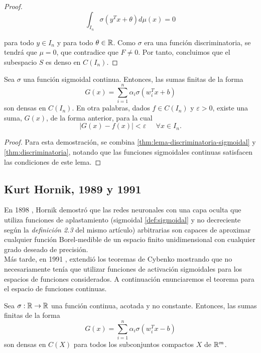 \begin{itemize}
\begin{proof}
$$\int_{I_n}\sigma(y^Tx+\theta)d\mu(x)=0$$

para todo $y\in I_n$ y para todo $\theta \in \mathbb{R}$. Como $\sigma$ era una función discriminatoria, se tendrá que $\mu=0$, que contradice que $F\ne 0$. Por tanto, concluimos que el subespacio $S$ es denso en $C(I_n)$.
\end{proof}
\begin{teorema}\label{thm:sigmoidal}
Sea $\sigma$ una función sigmoidal continua. Entonces, las sumas finitas de la forma $$G(x)=\sum_{i=1}^n \alpha_i \sigma(w_i^Tx+b)$$ son densas en $C(I_n)$. En otra palabras, dados $f\in C(I_n)$ y $\varepsilon>0$, existe una suma, $G(x)$, de la forma anterior, para la cual $$|G(x)-f(x)|<\varepsilon \;\;\;\;\; \forall x \in I_n.$$
\end{teorema}
\begin{proof}
Para esta demostración, se combina \autoref{thm:lema-discriminatoria-sigmoidal} y \autoref{thm:discriminatoria}, notando que las funciones sigmoidales continuas satisfacen las condiciones de este lema.
\end{proof}

\subsection{Kurt Hornik, 1989 y 1991}

En 1898 \cite{HornikEtAl89}, Hornik demostró que las redes neuronales con una capa oculta que utiliza funciones de aplastamiento (sigmoidal \autoref{def:sigmoidal} y no decreciente según la \emph{definición 2.3} del mismo artículo) arbitrarias son capaces de aproximar cualquier función Borel-medible de un espacio finito unidimensional con cualquier grado deseado de precisión.\\

Más tarde, en 1991 \cite{Kurt1991251}, extendió los teoremas de Cybenko mostrando que no necesariamente tenía que utilizar funciones de activación sigmoidales para los espacios de funciones considerados. A continuación enunciaremos el teorema para el espacio de funciones continuas.\\

\begin{teorema}
Sea $\sigma: \mathbb{R} \to \mathbb{R}$ una función continua, acotada y no constante. Entonces, las sumas finitas de la forma $$G(x)=\sum_{i=1}^n \alpha_i \sigma(w_i^Tx-b)$$ son densas en $C(X)$ para todos los subconjuntos compactos $X$ de $\mathbb{R}^m$.
\end{teorema}


\end{itemize}

